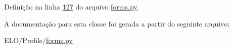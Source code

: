 Definição na linha \hyperlink{Profile_2forms_8py_source_l00127}{127} do arquivo \hyperlink{Profile_2forms_8py_source}{forms.\-py}.



A documentação para esta classe foi gerada a partir do seguinte arquivo\-:\begin{DoxyCompactItemize}
\item 
E\-L\-O/\-Profile/\hyperlink{Profile_2forms_8py}{forms.\-py}\end{DoxyCompactItemize}
